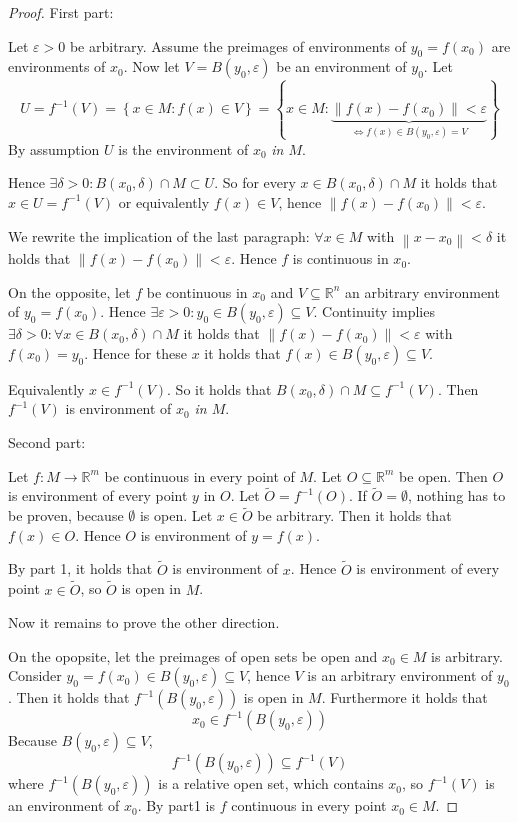 \documentclass[a4paper,landscape,twocolumn]{article}
\theoremstyle{definition}
\newcommand\set[1]{\left\{#1\right\}}
\newcommand\norm[1]{\left\|#1\right\|}
\begin{document}
\begin{proof}
  First part:

  Let $\varepsilon > 0$ be arbitrary. Assume the preimages of environments of $y_0 = f(x_0)$
  are environments of $x_0$.
  Now let $V = B(y_0,\varepsilon)$ be an environment of $y_0$.
  Let
  \[ U = f^{-1}(V) = \set{x \in M: f(x) \in V} = \set{x \in M: \underbrace{\norm{f(x) - f(x_0)} < \varepsilon}_{\iff f(x) \in B(y_0,\varepsilon) = V}} \]
  By assumption $U$ is the environment of $x_0$ \emph{in $M$}.
  
  Hence $\exists \delta > 0: B(x_0, \delta) \cap M \subset U$.
  So for every $x \in B(x_0,\delta) \cap M$ it holds that
  $x \in U = f^{-1}(V)$ or equivalently $f(x) \in V$,
  hence $\norm{f(x) - f(x_0)} < \varepsilon$.

  We rewrite the implication of the last paragraph:
  $\forall x \in M$ with $\norm{x - x_0} < \delta$ it holds that
  $\norm{f(x) - f(x_0)} < \varepsilon$.
  Hence $f$ is continuous in $x_0$.

  On the opposite, let $f$ be continuous in $x_0$ and $V \subseteq \mathbb R^n$
  an arbitrary environment of $y_0 = f(x_0)$.
  Hence $\exists \varepsilon > 0: y_0 \in B(y_0, \varepsilon) \subseteq V$.
  Continuity implies $\exists \delta > 0: \forall x \in B(x_0,\delta) \cap M$
  it holds that $\norm{f(x) - f(x_0)} < \varepsilon$ with $f(x_0) = y_0$.
  Hence for these $x$ it holds that $f(x) \in B(y_0,\varepsilon) \subseteq V$.

  Equivalently $x \in f^{-1}(V)$.
  So it holds that $B(x_0,\delta) \cap M \subseteq f^{-1}(V)$.
  Then $f^{-1}(V)$ is environment of $x_0$ \emph{in $M$}.

  Second part:

  Let $f: M \to \mathbb R^m$ be continuous in every point of $M$.
  Let $O \subseteq \mathbb R^m$ be open. Then $O$ is environment of
  every point $y$ in $O$. Let $\tilde{O} = f^{-1}(O)$.
  If $\tilde{O} = \emptyset$, nothing has to be proven, because $\emptyset$ is open.
  Let $x \in \tilde{O}$ be arbitrary. Then it holds that $f(x) \in O$.
  Hence $O$ is environment of $y = f(x)$.

  By part 1, it holds that $\tilde{O}$ is environment of $x$.
  Hence $\tilde{O}$ is environment of every point $x \in \tilde{O}$,
  so $\tilde{O}$ is open in $M$.

  Now it remains to prove the other direction.
  
  On the opopsite, let the preimages of open sets be open and $x_0 \in M$ is arbitrary.
  Consider $y_0 = f(x_0) \in B(y_0,\varepsilon) \subseteq V$, hence $V$ is an
  arbitrary environment of $y_0$. Then it holds that $f^{-1}(B(y_0,\varepsilon))$
  is open in $M$. Furthermore it holds that
  \[ x_0 \in f^{-1}(B(y_0,\varepsilon)) \]
  Because $B(y_0,\varepsilon) \subseteq V$,
  \[ f^{-1}(B(y_0,\varepsilon)) \subseteq f^{-1}(V) \]
  where $f^{-1}(B(y_0,\varepsilon))$ is a relative open set, which contains $x_0$,
  so $f^{-1}(V)$ is an environment of $x_0$. By part1 is $f$ continuous in every point
  $x_0 \in M$.
\end{proof}
\end{document}
